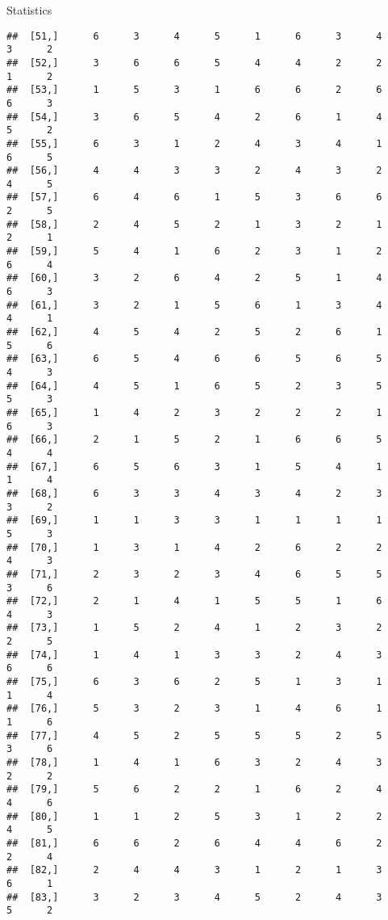 \documentclass[
  ignorenonframetext,
]{beamer}
\begin{document}
\begin{frame}[fragile]{Statistics}
\begin{verbatim}
##  [51,]      6      3      4      5      1      6      3      4      3      2
##  [52,]      3      6      6      5      4      4      2      2      1      2
##  [53,]      1      5      3      1      6      6      2      6      6      3
##  [54,]      3      6      5      4      2      6      1      4      5      2
##  [55,]      6      3      1      2      4      3      4      1      6      5
##  [56,]      4      4      3      3      2      4      3      2      4      5
##  [57,]      6      4      6      1      5      3      6      6      2      5
##  [58,]      2      4      5      2      1      3      2      1      2      1
##  [59,]      5      4      1      6      2      3      1      2      6      4
##  [60,]      3      2      6      4      2      5      1      4      6      3
##  [61,]      3      2      1      5      6      1      3      4      4      1
##  [62,]      4      5      4      2      5      2      6      1      5      6
##  [63,]      6      5      4      6      6      5      6      5      4      3
##  [64,]      4      5      1      6      5      2      3      5      5      3
##  [65,]      1      4      2      3      2      2      2      1      6      3
##  [66,]      2      1      5      2      1      6      6      5      4      4
##  [67,]      6      5      6      3      1      5      4      1      1      4
##  [68,]      6      3      3      4      3      4      2      3      3      2
##  [69,]      1      1      3      3      1      1      1      1      5      3
##  [70,]      1      3      1      4      2      6      2      2      4      3
##  [71,]      2      3      2      3      4      6      5      5      3      6
##  [72,]      2      1      4      1      5      5      1      6      4      3
##  [73,]      1      5      2      4      1      2      3      2      2      5
##  [74,]      1      4      1      3      3      2      4      3      6      6
##  [75,]      6      3      6      2      5      1      3      1      1      4
##  [76,]      5      3      2      3      1      4      6      1      1      6
##  [77,]      4      5      2      5      5      5      2      5      3      6
##  [78,]      1      4      1      6      3      2      4      3      2      2
##  [79,]      5      6      2      2      1      6      2      4      4      6
##  [80,]      1      1      2      5      3      1      2      2      4      5
##  [81,]      6      6      2      6      4      4      6      2      2      4
##  [82,]      2      4      4      3      1      2      1      3      6      1
##  [83,]      3      2      3      4      5      2      4      3      5      2

\end{verbatim}
\end{frame}
\end{document}

